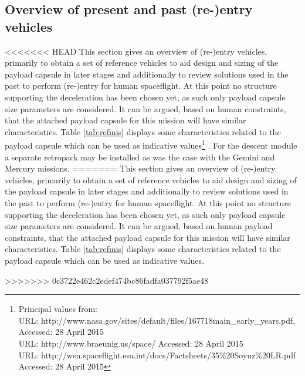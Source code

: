 \subsection{Overview of present and past (re-)entry vehicles}\label{cha:past missions}
<<<<<<< HEAD
This section gives an overview of (re-)entry vehicles, primarily to obtain a set of reference vehicles to aid design and sizing of the payload capsule in later stages and additionally to review solutions used in the past to perform (re-)entry for human spaceflight. At this point no structure supporting the deceleration has been chosen yet, as such only payload capsule size parameters are considered. It can be argued, based on human constraints, that the attached payload capsule for this mission will have similar characteristics. Table \ref{tab:refmis} displays some characteristics related to the payload capsule which can be used as indicative values\footnote{Principal values from: \\
URL: http://www.nasa.gov/sites/default/files/167718main\_early\_years.pdf,  Accessed: 28 April 2015 \\ URL: http://www.braeunig.us/space/  Accessed: 28 April 2015 \\ URL: http://wsn.spaceflight.esa.int/docs/Factsheets/35\%20Soyuz\%20LR.pdf Accessed: 28 April 2015
}
. For the descent module a separate retropack may be installed as was the case with the Gemini and Mercury missions.
=======
This section gives an overview of (re-)entry vehicles, primarily to obtain a set of reference vehicles to aid design and sizing of the payload capsule in later stages and additionally to review solutions used in the past to perform (re-)entry for human spaceflight. At this point no structure supporting the deceleration has been chosen yet, as such only payload capsule size parameters are considered. It can be argued, based on human payload constraints, that the attached payload capsule for this mission will have similar characteristics. Table \ref{tab:refmis} displays some characteristics related to the payload capsule which can be used as indicative values. 

>>>>>>> 0c3722e462c2edef474bc86fadfa037792f5ae48


